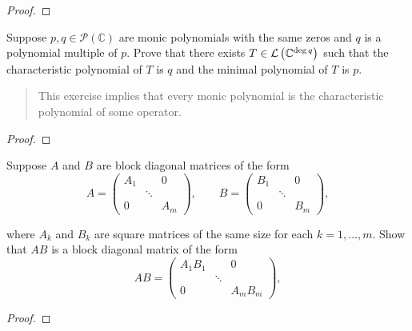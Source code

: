 \begin{proof}
\end{proof}
\newpage

\begin{exercise}\label{chapter8:sectionB:exercise21}
    Suppose $p, q\in\mathscr{P}(\mathbb{C})$ are monic polynomials with the same zeros and $q$ is a polynomial multiple of $p$. Prove that there exists $T\in\mathcal{L}\left({\mathbb{C}^{\deg q}}\right)$ such that the characteristic polynomial of $T$ is $q$ and the minimal polynomial of $T$ is $p$.
\end{exercise}

\begin{quote}
    This exercise implies that every monic polynomial is the characteristic polynomial of some operator.
\end{quote}

\begin{proof}
\end{proof}
\newpage

\begin{exercise}\label{chapter8:sectionB:exercise22}
    Suppose $A$ and $B$ are block diagonal matrices of the form
    \[
        A = \begin{pmatrix}
            A_{1} &        & 0     \\
                  & \ddots &       \\
            0     &        & A_{m}
        \end{pmatrix},
        \qquad
        B = \begin{pmatrix}
            B_{1} &        & 0     \\
                  & \ddots &       \\
            0     &        & B_{m}
        \end{pmatrix},
    \]

    where $A_{k}$ and $B_{k}$ are square matrices of the same size for each $k = 1, \ldots, m$. Show that $AB$ is a block diagonal matrix of the form
    \[
        AB = \begin{pmatrix}
            A_{1}B_{1} &        & 0          \\
                       & \ddots &            \\
            0          &        & A_{m}B_{m}
        \end{pmatrix},
    \]
\end{exercise}

\begin{proof}
\end{proof}
\newpage

